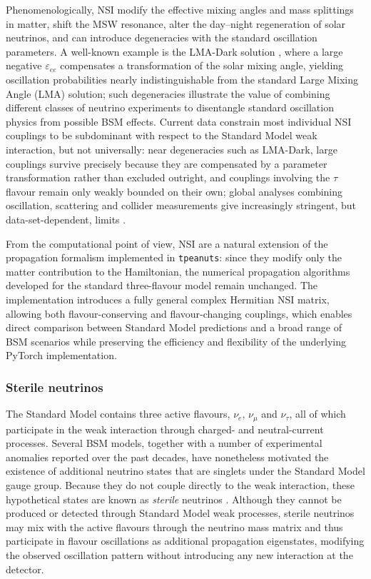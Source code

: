 Phenomenologically, NSI modify the effective mixing angles and mass splittings in matter, shift the MSW resonance, alter the day--night regeneration of solar neutrinos, and can introduce degeneracies with the standard oscillation parameters. A well-known example is the LMA-Dark solution \parencite{MirandaTortolaValle2004,Esteban2018}, where a large negative \(\varepsilon_{ee}\) compensates a transformation of the solar mixing angle, yielding oscillation probabilities nearly indistinguishable from the standard Large Mixing Angle (LMA) solution; such degeneracies illustrate the value of combining different classes of neutrino experiments to disentangle standard oscillation physics from possible BSM effects. Current data constrain most individual NSI couplings to be subdominant with respect to the Standard Model weak interaction, but not universally: near degeneracies such as LMA-Dark, large couplings survive precisely because they are compensated by a parameter transformation rather than excluded outright, and couplings involving the \(\tau\) flavour remain only weakly bounded on their own; global analyses combining oscillation, scattering and collider measurements give increasingly stringent, but data-set-dependent, limits \parencite{Biggio2009,Esteban2018}.

From the computational point of view, NSI are a natural extension of the propagation formalism implemented in \texttt{tpeanuts}: since they modify only the matter contribution to the Hamiltonian, the numerical propagation algorithms developed for the standard three-flavour model remain unchanged. The implementation introduces a fully general complex Hermitian NSI matrix, allowing both flavour-conserving and flavour-changing couplings, which enables direct comparison between Standard Model predictions and a broad range of BSM scenarios while preserving the efficiency and flexibility of the underlying PyTorch implementation.

\subsubsection{Sterile neutrinos}
\label{sec:sterile-formalism}

The Standard Model contains three active flavours, \(\nu_e\), \(\nu_\mu\) and \(\nu_\tau\), all of which participate in the weak interaction through charged- and neutral-current processes. Several BSM models, together with a number of experimental anomalies reported over the past decades, have nonetheless motivated the existence of additional neutrino states that are singlets under the Standard Model gauge group. Because they do not couple directly to the weak interaction, these hypothetical states are known as \emph{sterile} neutrinos \parencite{Boser2020}. Although they cannot be produced or detected through Standard Model weak processes, sterile neutrinos may mix with the active flavours through the neutrino mass matrix and thus participate in flavour oscillations as additional propagation eigenstates, modifying the observed oscillation pattern without introducing any new interaction at the detector.

